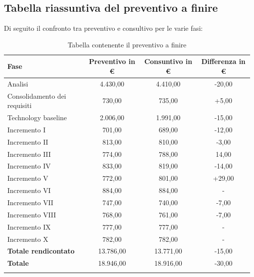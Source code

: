 	 	\subsection{Tabella riassuntiva del preventivo a finire}
	 		Di seguito il confronto tra preventivo e consultivo per le varie fasi:
			 \begin{longtable}{|l|c|c|c|}
			 	\hline
			 	\rowcolor{lighter-grayer}
			 	\textbf{Fase} & \textbf{Preventivo in €} & \textbf{Consuntivo in €} & \textbf{Differenza in €}\\
			 	\hline
				\endfirsthead
			 	
			 	\hline
			 	Analisi & 4.430,00 & 4.410,00 & -20,00\\
			 	\hline
			 	\hline
			 	Consolidamento dei requisiti & 730,00 & 735,00 & +5,00\\
			 	\hline
			 	\hline
			 	Technology baseline & 2.006,00 & 1.991,00 & -15,00\\
			 	\hline
			 	\hline
			 	Incremento I & 701,00 & 689,00 & -12,00\\
			 	\hline
			 	\hline
			 	Incremento II & 813,00 & 810,00 & -3,00\\
			 	\hline
			 	\hline
			 	Incremento III & 774,00 & 788,00 & 14,00\\
			 	\hline
			 	\hline
			 	Incremento IV & 833,00 & 819,00 & -14,00\\
			 	\hline
			 	\hline
			 	Incremento V & 772,00 & 801,00 & +29,00\\
			 	\hline
			 	\hline
			 	Incremento VI & 884,00 & 884,00 & -\\
			 	\hline
			 	\hline
			 	Incremento VII & 747,00 & 740,00 & -7,00\\
			 	\hline
			 	\hline
			 	Incremento VIII & 768,00 & 761,00 & -7,00\\
			 	\hline
			 	\hline
			 	Incremento IX & 777,00 & 777,00 & -\\
			 	\hline
			 	\hline
			 	Incremento X & 782,00 & 782,00 & -\\
			 	\hline
			 	\textbf{Totale rendicontato} & 13.786,00 & 13.771,00 & -15,00\\
			 	\hline
			 	\hline
			 	\textbf{Totale} & 18.946,00 & 18.916,00 & -30,00\\
			 	\hline
			 	\caption{Tabella contenente il preventivo a finire}
			 \end{longtable}

